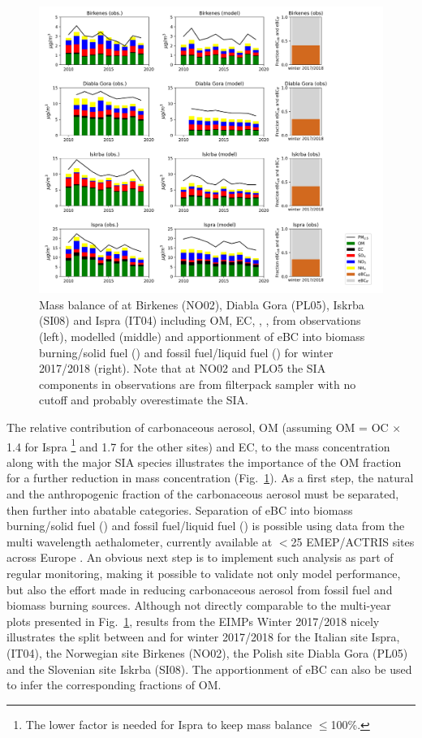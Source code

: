 \begin{figure}
\includegraphics[width=16cm]{FIGS_TRENDS/Composition_4sites.png}
 \caption{
  Mass balance of \pmfine at  Birkenes (NO02), Diabla Gora
  (PL05), Iskrba (SI08) and Ispra (IT04) including OM, EC, , ,  from 
  observations (left), modelled (middle) and apportionment of eBC
  into biomass burning/solid fuel (\EBCff) and fossil fuel/liquid fuel
  (\EBCbb) for winter 2017/2018 (right). Note that at NO02 and PLO5 the SIA components in observations are from filterpack sampler with no cutoff and probably overestimate the \pmfine SIA. \label{fig:KEX4}
 }
\end{figure}


The relative contribution of carbonaceous aerosol, OM (assuming OM = OC $\times$
1.4 for Ispra
\footnote{The lower factor is needed for Ispra to keep mass balance $\le$100\%.}
and 1.7 for the other sites)
 and EC, to the \pmfine mass concentration along with the major
SIA species illustrates the importance of the OM fraction for a further
reduction in \pmfine mass concentration (Fig.~\ref{fig:KEX4}). As a first step,
the natural and the anthropogenic fraction of the carbonaceous aerosol
must be separated, then further into abatable categories. Separation of
eBC into biomass burning/solid fuel (\EBCbb) and fossil fuel/liquid fuel
(\EBCff) is possible using data from the multi wavelength aethalometer,
currently available at $<$25 EMEP/ACTRIS sites across Europe \citep{Yttri:2014,Platt:2020a,Platt:2020b,Platt20XX}. An obvious next
step is to implement such analysis as part of regular monitoring,
making it possible to validate not only model performance, but also the
effort made in reducing carbonaceous aerosol from fossil fuel and biomass
burning sources. Although not directly comparable to the multi-year plots
presented in Fig.~\ref{fig:KEX4}, results from the EIMPs Winter 2017/2018 nicely
illustrates the split between \EBCbb and \EBCff for winter 2017/2018 for
the Italian site Ispra, (IT04), the Norwegian site Birkenes (NO02), the
Polish site Diabla Gora (PL05) and the Slovenian site Iskrba (SI08). The
apportionment of eBC can also be used to infer the corresponding fractions
of OM.

